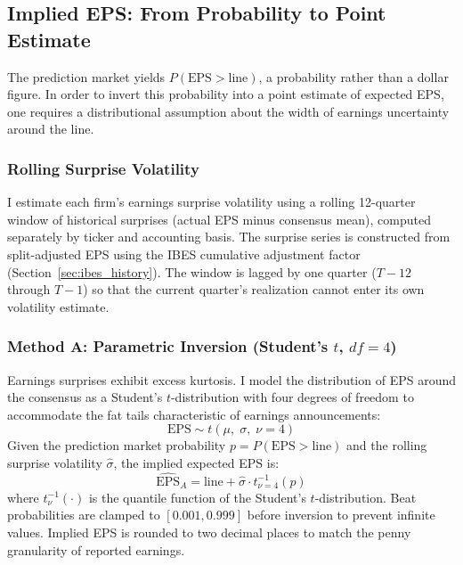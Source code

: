 \documentclass[11pt]{article}
\begin{document}
\subsection{Implied EPS: From Probability to Point Estimate} \label{sec:implied}

The prediction market yields $P(\text{EPS} > \text{line})$, a probability rather than a dollar figure. In order to invert this probability into a point estimate of expected EPS, one requires a distributional assumption about the width of earnings uncertainty around the line.

\subsubsection{Rolling Surprise Volatility}

I estimate each firm's earnings surprise volatility using a rolling 12-quarter window of historical surprises (actual EPS minus consensus mean), computed separately by ticker and accounting basis. The surprise series is constructed from split-adjusted EPS using the IBES cumulative adjustment factor (Section~\ref{sec:ibes_history}). The window is lagged by one quarter ($T-12$ through $T-1$) so that the current quarter's realization cannot enter its own volatility estimate.

\subsubsection{Method A: Parametric Inversion (Student's $t$, $df=4$)}

Earnings surprises exhibit excess kurtosis. I model the distribution of EPS around the consensus as a Student's $t$-distribution with four degrees of freedom to accommodate the fat tails characteristic of earnings announcements:
\begin{equation}
\text{EPS} \sim t\!\left(\mu,\; \sigma,\; \nu = 4\right)
\end{equation}
Given the prediction market probability $p = P(\text{EPS} > \text{line})$ and the rolling surprise volatility $\hat{\sigma}$, the implied expected EPS is:
\begin{equation}
\widehat{\text{EPS}}_A = \text{line} + \hat{\sigma} \cdot t^{-1}_{\nu=4}(p)
\end{equation}
where $t^{-1}_{\nu}(\cdot)$ is the quantile function of the Student's $t$-distribution. Beat probabilities are clamped to $[0.001, 0.999]$ before inversion to prevent infinite values. Implied EPS is rounded to two decimal places to match the penny granularity of reported earnings.
\end{document}
